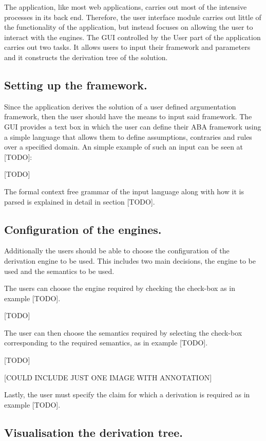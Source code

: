 The application, like most web applications, carries out most of the intensive processes in its back end. Therefore, the user interface module carries out little of the functionality of the application, but instead focuses on allowing the user to interact with the engines. The GUI controlled by the User part of the application carries out two tasks. It allows users to input their framework and parameters and it constructs the derivation tree of the solution.

\subsection{Setting up the framework.}

Since the application derives the solution of a user defined argumentation framework, then the user should have the means to input said framework. The GUI provides a text box in which the user can define their ABA framework using a simple language that allows them to define assumptions, contraries and rules over a specified domain. An simple example of such an input can be seen at [TODO]:

[TODO]

The formal context free grammar of the input language along with how it is parsed is explained in detail in section [TODO].

\subsection{Configuration of the engines.}

Additionally the users should be able to choose the configuration of the derivation engine to be used. This includes two main decisions, the engine to be used and the semantics to be used.

The users can choose the engine required by checking the check-box as in example [TODO].

[TODO]

The user can then choose the semantics required by selecting the check-box corresponding to the required semantics, as in example [TODO].

[TODO]

[COULD INCLUDE JUST ONE IMAGE WITH ANNOTATION]

Lastly, the user must specify the claim for which a derivation is required as in example [TODO].

\subsection{Visualisation the derivation tree.}

